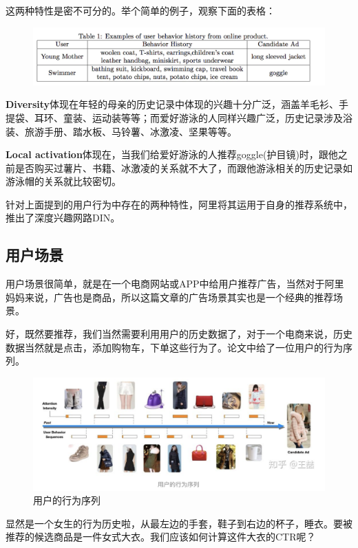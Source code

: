 \documentclass[12pt]{article}
\begin{document}
这两种特性是密不可分的。举个简单的例子，观察下面的表格：
\begin{figure}[H]
    \centering
    \includegraphics[width=1\textwidth]{fig/DIN_User_Interest_Table_Example.png}
\end{figure}

\textbf{Diversity}体现在年轻的母亲的历史记录中体现的兴趣十分广泛，涵盖羊毛衫、手提袋、耳环、童装、运动装等等；而爱好游泳的人同样兴趣广泛，历史记录涉及浴装、旅游手册、踏水板、马铃薯、冰激凌、坚果等等。

\textbf{Local activation}体现在，当我们给爱好游泳的人推荐goggle(护目镜)时，跟他之前是否购买过薯片、书籍、冰激凌的关系就不大了，而跟他游泳相关的历史记录如游泳帽的关系就比较密切。

针对上面提到的用户行为中存在的两种特性，阿里将其运用于自身的推荐系统中，推出了深度兴趣网路DIN。

\subsection{用户场景}
用户场景很简单，就是在一个电商网站或APP中给用户推荐广告，当然对于阿里妈妈来说，广告也是商品，所以这篇文章的广告场景其实也是一个经典的推荐场景。

好，既然要推荐，我们当然需要利用用户的历史数据了，对于一个电商来说，历史数据当然就是点击，添加购物车，下单这些行为了。论文中给了一位用户的行为序列。
\begin{figure}[H]
    \centering
    \includegraphics[width=1\textwidth]{fig/Ali_User_Behavior_Sequence.png}
    \caption{用户的行为序列}
\end{figure}

显然是一个女生的行为历史啦，从最左边的手套，鞋子到右边的杯子，睡衣。要被推荐的候选商品是一件女式大衣。我们应该如何计算这件大衣的CTR呢？
\end{document}
